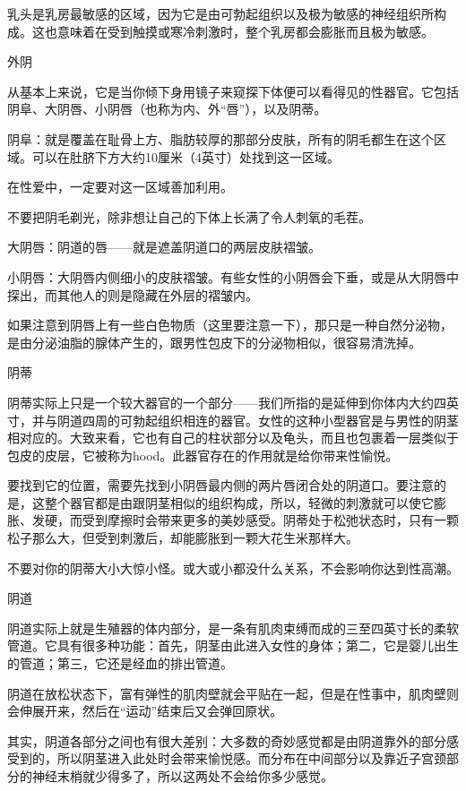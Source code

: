 \documentclass[12pt,UTF8,openany]{ctexbook}
\begin{document}
乳头是乳房最敏感的区域，因为它是由可勃起组织以及极为敏感的神经组织所构成。这也意味着在受到触摸或寒冷刺激时，整个乳房都会膨胀而且极为敏感。

外阴

从基本上来说，它是当你倾下身用镜子来窥探下体便可以看得见的性器官。它包括阴阜、大阴唇、小阴唇（也称为内、外“唇”），以及阴蒂。

阴阜：就是覆盖在耻骨上方、脂肪较厚的那部分皮肤，所有的阴毛都生在这个区域。可以在肚脐下方大约10厘米（4英寸）处找到这一区域。

在性爱中，一定要对这一区域善加利用。

不要把阴毛剃光，除非想让自己的下体上长满了令人刺氧的毛茬。

大阴唇：阴道的唇——就是遮盖阴道口的两层皮肤褶皱。

小阴唇：大阴唇内侧细小的皮肤褶皱。有些女性的小阴唇会下垂，或是从大阴唇中探出，而其他人的则是隐藏在外层的褶皱内。

如果注意到阴唇上有一些白色物质（这里要注意一下），那只是一种自然分泌物，是由分泌油脂的腺体产生的，跟男性包皮下的分泌物相似，很容易清洗掉。

阴蒂

阴蒂实际上只是一个较大器官的一个部分——我们所指的是延伸到你体内大约四英寸，并与阴道四周的可勃起组织相连的器官。女性的这种小型器官是与男性的阴茎相对应的。大致来看，它也有自己的柱状部分以及龟头，而且也包裹着一层类似于包皮的皮层，它被称为hood。此器官存在的作用就是给你带来性愉悦。

要找到它的位置，需要先找到小阴唇最内侧的两片唇闭合处的阴道口。要注意的是，这整个器官都是由跟阴茎相似的组织构成，所以，轻微的刺激就可以使它膨胀、发硬，而受到摩擦时会带来更多的美妙感受。阴蒂处于松弛状态时，只有一颗松子那么大，但受到刺激后，却能膨胀到一颗大花生米那样大。

不要对你的阴蒂大小大惊小怪。或大或小都没什么关系，不会影响你达到性高潮。

阴道

阴道实际上就是生殖器的体内部分，是一条有肌肉束缚而成的三至四英寸长的柔软管道。它具有很多种功能：首先，阴茎由此进入女性的身体；第二，它是婴儿出生的管道；第三，它还是经血的排出管道。

阴道在放松状态下，富有弹性的肌肉壁就会平贴在一起，但是在性事中，肌肉壁则会伸展开来，然后在“运动”结束后又会弹回原状。

其实，阴道各部分之间也有很大差别：大多数的奇妙感觉都是由阴道靠外的部分感受到的，所以阴茎进入此处时会带来愉悦感。而分布在中间部分以及靠近子宫颈部分的神经末梢就少得多了，所以这两处不会给你多少感觉。
\end{document}
